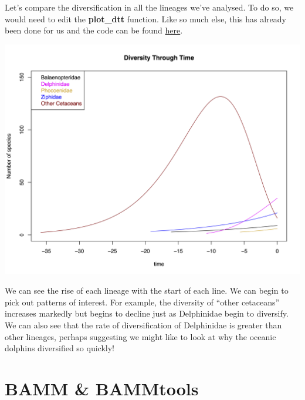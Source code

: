 \documentclass[
]{book}
\newenvironment{Shaded}{\begin{snugshade}}{\end{snugshade}}
\newcommand{\DataTypeTok}[1]{\textcolor[rgb]{0.13,0.29,0.53}{#1}}
\newcommand{\KeywordTok}[1]{\textcolor[rgb]{0.13,0.29,0.53}{\textbf{#1}}}
\newcommand{\NormalTok}[1]{#1}
\newcommand{\OperatorTok}[1]{\textcolor[rgb]{0.81,0.36,0.00}{\textbf{#1}}}
\begin{document}
\begin{Shaded}
\end{Shaded}

Let's compare the diversification in all the lineages we've analysed. To do so, we would need to edit the \textbf{plot\_dtt} function. Like so much else, this has already been done for us and the code can be found \href{http://lukejharmon.github.io/ilhabela/instruction/2015/07/02/diversification-analysis-bamm-rpanda/\#rpanda}{here}.

\begin{center}\includegraphics[width=76.04in]{Images/Diversityplot} \end{center}

We can see the rise of each lineage with the start of each line. We can begin to pick out patterns of interest. For example, the diversity of ``other cetaceans'' increases markedly but begins to decline just as Delphinidae begin to diversify. We can also see that the rate of diversification of Delphinidae is greater than other lineages, perhaps suggesting we might like to look at why the oceanic dolphins diversified so quickly!

\hypertarget{bamm-bammtools}{%
\section{BAMM \& BAMMtools}\label{bamm-bammtools}}
\end{document}
